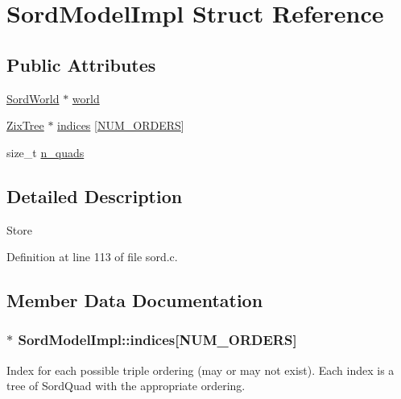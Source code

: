 \hypertarget{struct_sord_model_impl}{}\section{Sord\+Model\+Impl Struct Reference}
\label{struct_sord_model_impl}
\subsection*{Public Attributes}
\begin{DoxyCompactItemize}
\item 
\hyperlink{group__sord_ga133d918ec58f829198b2cf65f250ed69}{Sord\+World} $\ast$ \hyperlink{struct_sord_model_impl_ab9a23ed686b1386ea310a3192e6d9cc5}{world}
\item 
\hyperlink{group__zix_ga684b19fdde4e1e069abd68304fa9518c}{Zix\+Tree} $\ast$ \hyperlink{struct_sord_model_impl_ab455069a1384696a69e25a728dccb5aa}{indices} \mbox{[}\hyperlink{sord_8c_a9237fc26918812bfb16ed5d1d8169724}{N\+U\+M\+\_\+\+O\+R\+D\+E\+RS}\mbox{]}
\item 
size\+\_\+t \hyperlink{struct_sord_model_impl_aa077b03efcbee4ed3acee0e8c5316b5a}{n\+\_\+quads}
\end{DoxyCompactItemize}


\subsection{Detailed Description}
Store 

Definition at line 113 of file sord.\+c.



\subsection{Member Data Documentation}
\subsubsection[{\texorpdfstring{indices}{indices}}]{$\ast$ Sord\+Model\+Impl\+::indices\mbox{[}{\bf N\+U\+M\+\_\+\+O\+R\+D\+E\+RS}\mbox{]}}\hypertarget{struct_sord_model_impl_ab455069a1384696a69e25a728dccb5aa}{}\label{struct_sord_model_impl_ab455069a1384696a69e25a728dccb5aa}
Index for each possible triple ordering (may or may not exist). Each index is a tree of Sord\+Quad with the appropriate ordering. 

